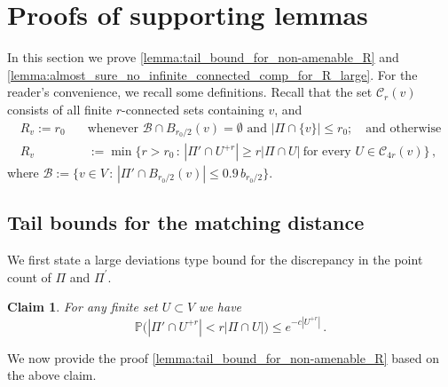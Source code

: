 \documentclass[11pt, reqno]{article}
\newtheorem{claim}[thm]{Claim}
\numberwithin{equation}{section}
\theoremstyle{definition}
\def\cC{\mathcal{C}}
\def\cB{\mathcal{B}}
\def\P{\mathbb{P}}
\newcommand{\1}{\mathds{1}}
\begin{document}
\section{Proofs of supporting lemmas}
\label{sec:proof_of_lemmas}

In this section we prove \cref{lemma:tail_bound_for_non-amenable_R} and \cref{lemma:almost_sure_no_infinite_connected_comp_for_R_large}.
For the reader's convenience, we recall some definitions.
Recall that the set $\cC_r(v)$ consists of all finite $r$-connected sets containing $v$, and
\begin{align*}
    R_v := r_0 \quad  &\text{whenever \  $\cB \cap B_{r_0/2}(v) = \emptyset$ \  and \  $|\Pi \cap \{v\}| \le r_0$};  \quad \text{and otherwise} \\
R_v &:= \min\Big\{ r>r_0 \, : \, |\Pi'\cap U^{+r}| \ge r |\Pi \cap U| \ \text{for every } U\in \cC_{4r}(v) \Big\} \, ,
\end{align*} 
where $\cB := \{ v\in V \, : \, |\Pi' \cap B_{r_0/2}(v)| \le 0.9 \,  b_{r_0/2} \}$.

\subsection{Tail bounds for the matching distance}

We first state a large deviations type bound for the discrepancy in the point count of $\Pi$ and $\Pi^\prime$.

\begin{claim}
    \label{claim:prob_bound_for_bad_point_count_in_U}
    For any finite set $U\subset V$ we have 
    \begin{equation*}
        \P\big(|\Pi'\cap U^{+r}| < r |\Pi \cap U| \big) \le e^{-c|U^{+r}|}\, .
    \end{equation*}
\end{claim}

We now provide the proof \cref{lemma:tail_bound_for_non-amenable_R} based on the above claim. 
\end{document}
